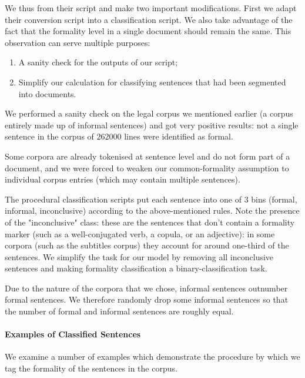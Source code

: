 \documentclass[11pt]{article}
\begin{document}
We thus from their script and make two important modifications. First we adapt their conversion script into a classification script. We also take advantage of the fact that the formality level in a single document should remain the same. This observation can serve multiple purposes:

\begin{enumerate}[label=\arabic*]
    \item A sanity check for the outputs of our script;
    \item Simplify our calculation for classifying sentences that had been segmented into documents.
\end{enumerate}

We performed a sanity check on the legal corpus we mentioned earlier (a corpus entirely made up of informal sentences) and got very positive results: not a single sentence in the corpus of $262000$ lines were identified as formal.

Some corpora are already tokenised at sentence level and do not form part of a document, and we were forced to weaken our common-formality assumption to individual corpus entries (which may contain multiple sentences). 

The procedural classification scripts put each sentence into one of $3$ bins (formal, informal, inconclusive) according to the above-mentioned rules. Note the presence of the "inconclusive" class: these are the sentences that don't contain a formality marker (such as a well-conjugated verb, a copula, or an adjective): in some corpora (such as the subtitles corpus) they account for around one-third of the sentences. We simplify the task for our model by removing all inconclusive sentences and making formality classification a binary-classification task. 

Due to the nature of the corpora that we chose, informal sentences outnumber formal sentences. We therefore randomly drop some informal sentences so that the number of formal and informal sentences are roughly equal.

\paragraph{Examples of Classified Sentences}

We examine a number of examples which demonstrate the procedure by which we tag the formality of the sentences in the corpus.
\end{document}

